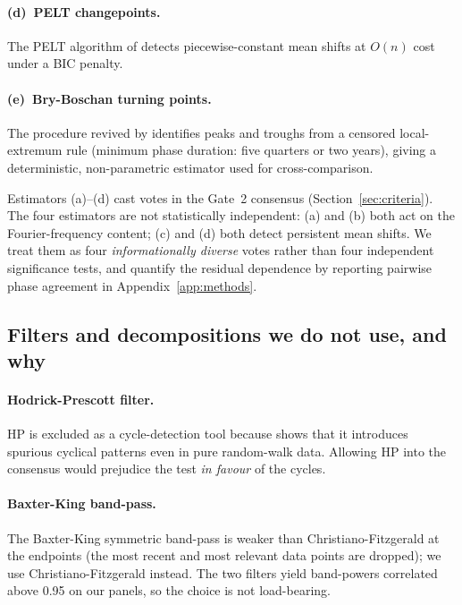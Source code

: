 \paragraph{(d)~PELT changepoints.}
The PELT algorithm of \citet{killick_fearnhead_eckley2012} detects
piecewise-constant mean shifts at \(O(n)\) cost under a BIC penalty.

\paragraph{(e)~Bry-Boschan turning points.}
The procedure \citep{bry_boschan1971} revived by
\citet{harding_pagan2002} identifies peaks and troughs from a
censored local-extremum rule (minimum phase duration: five
quarters or two years), giving a deterministic, non-parametric
estimator used for cross-comparison.

Estimators (a)--(d) cast votes in the Gate~2 consensus
(Section~\ref{sec:criteria}). The four estimators are not
statistically independent: (a) and (b) both act on the
Fourier-frequency content; (c) and (d) both detect persistent
mean shifts. We treat them as four \emph{informationally diverse}
votes rather than four independent significance tests, and
quantify the residual dependence by reporting pairwise phase
agreement in Appendix~\ref{app:methods}.

\subsection{Filters and decompositions we do not use, and why}
\label{sec:methods_excluded}

\paragraph{Hodrick-Prescott filter.}
HP is excluded as a cycle-detection tool because
\citet{hamilton2018} shows that it introduces spurious cyclical
patterns even in pure random-walk data. Allowing HP into the
consensus would prejudice the test \emph{in favour} of the cycles.

\paragraph{Baxter-King band-pass.}
The Baxter-King symmetric band-pass \citep{baxter_king1999} is
weaker than Christiano-Fitzgerald at the endpoints (the most
recent and most relevant data points are dropped); we use
Christiano-Fitzgerald instead. The two filters yield band-powers
correlated above 0.95 on our panels, so the choice is not
load-bearing.

